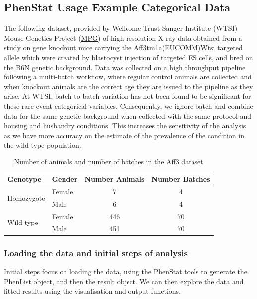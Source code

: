 \documentclass[12pt,a4paper]{article}
\begin{document}
\subsection{PhenStat Usage Example Categorical Data}
The following dataset, provided by Wellcome Trust Sanger Institute (WTSI) Mouse Genetics Project (\href{http://www.sanger.ac.uk/resources/mouse/}{MPG}) of high resolution X-ray data obtained from 
a study on gene knockout mice carrying the Aff3tm1a(EUCOMM)Wtsi targeted allele which were created by blastocyst injection of targeted ES cells, and bred on the B6N genetic background. 
Data was collected on a high throughput pipeline following a multi-batch workflow, where regular control animals are collected and when knockout animals are the correct age they are issued to the pipeline as they arise. 
At WTSI, batch to batch variation has not been found to be significant for these rare event categorical variables. 
Consequently, we ignore batch and combine data for the same genetic background when collected with the same protocol and housing and husbandry conditions. 
This increases the sensitivity of the analysis as we have more accuracy on the estimate of the prevalence of the condition in the wild type population.

\begin{table}[!h]
\begin{center}
\begin{tabular}{| l | l | c | c |}
  \hline
Genotype&Gender&Number Animals&Number Batches\\\hline
\multirow{2}{*}{Homozygote}&Female&7&4\\
			    &Male&6&4\\
			    \hline
\multirow{2}{*}{Wild type}&Female&446&70\\
			    &Male&451&70\\

\hline  
\end{tabular}
\caption{Number of animals and number of batches in the Aff3 dataset}\label{table:06}
\end{center}
\end{table}

\subsubsection{Loading the data and initial steps of analysis}
Initial steps focus on loading the data, using the PhenStat tools to generate the PhenList object, and then the result object.  We can then explore the data and fitted results using the visualisation and output functions.   
\end{document}
